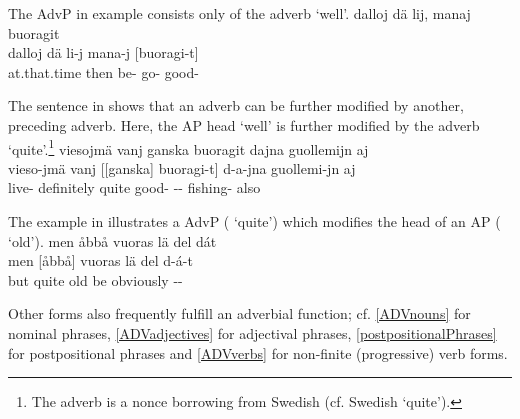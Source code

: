 The AdvP in example  consists only of the adverb  ‘well’. %
\ea\label{AdvPex1}
\glll	dalloj dä lij, manaj buoragit\\
	dalloj dä li-j mana-j {[buoragi-t]\subAdvP}\\
	at.that.time then be- go- good-\\\nopagebreak
{}	
\z

The sentence in  shows that an adverb can be further modified by another, preceding adverb. Here, the AP head  ‘well’ is further modified by the adverb  ‘quite’.\footnote{The adverb  is a nonce borrowing from Swedish (cf. Swedish  ‘quite’).}
\ea\label{derivedADVsEx2repeat}%
\glll	viesojmä vanj ganska buoragit dajna guollemijn aj\\
	vieso-jmä vanj {[[ganska]\subAdvP{}} {buoragi-t]\subAdvP{}} d-a-jna guollemi-jn aj\\
	live- definitely quite good- -- fishing- also\\\nopagebreak
{}	
\z

The example in  illustrates a AdvP ( ‘quite’) which modifies the head of an AP ( ‘old’).
\ea\label{AdvPex2}
\glll	men åbbå vuoras lä del dát\\
	men {[åbbå]\subAdvP} vuoras lä del d-á-t\\
	but quite old\BS{} be\BS{} obviously --\\\nopagebreak
{}	
\z

Other forms also frequently fulfill an adverbial function; cf. 
\SEC\ref{ADVnouns} for nominal phrases, 
\SEC\ref{ADVadjectives} for adjectival phrases, 
\SEC\ref{postpositionalPhrases} for postpositional phrases 
and \SEC\ref{ADVverbs} for non-finite (progressive) verb forms. 




